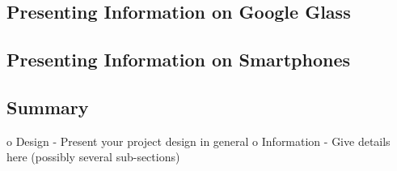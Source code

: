 

\subsection{Presenting Information on Google Glass}
\label{subsec:informationlimitedspace}


\subsection{Presenting Information on Smartphones}
\label{subsec:smartphones}


\subsection{Summary}
\label{subsec:summary}


o   Design - Present your project design in general
o   Information - Give details here (possibly several sub-sections)

